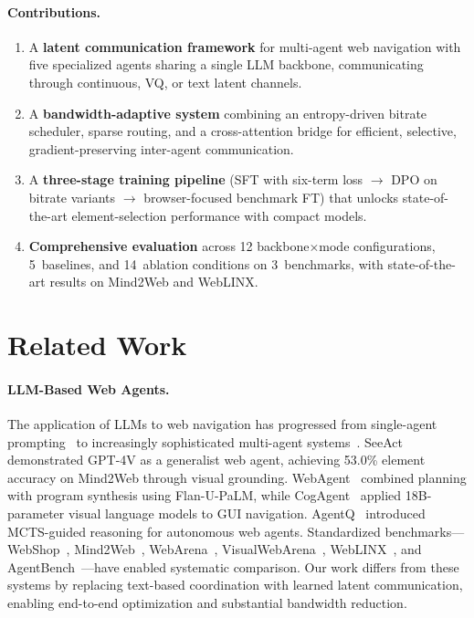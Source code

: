 \documentclass{article}
\begin{document}
\paragraph{Contributions.}
\begin{enumerate}[leftmargin=*,itemsep=1pt,topsep=2pt]
\item A \textbf{latent communication framework} for multi-agent web navigation with five specialized agents sharing a single LLM backbone, communicating through continuous, VQ, or text latent channels.
\item A \textbf{bandwidth-adaptive system} combining an entropy-driven bitrate scheduler, sparse routing, and a cross-attention bridge for efficient, selective, gradient-preserving inter-agent communication.
\item A \textbf{three-stage training pipeline} (SFT with six-term loss $\to$ DPO on bitrate variants $\to$ browser-focused benchmark FT) that unlocks state-of-the-art element-selection performance with compact models.
\item \textbf{Comprehensive evaluation} across 12 backbone$\times$mode configurations, 5~baselines, and 14~ablation conditions on 3~benchmarks, with state-of-the-art results on Mind2Web and WebLINX.
\end{enumerate}

\section{Related Work}
\label{sec:related}

\paragraph{LLM-Based Web Agents.}
The application of LLMs to web navigation has progressed from single-agent prompting~\cite{yao2023react,wang2023plan} to increasingly sophisticated multi-agent systems~\cite{wu2023autogen,hong2023metagpt}.
SeeAct~\cite{zheng2024seeact} demonstrated GPT-4V as a generalist web agent, achieving 53.0\% element accuracy on Mind2Web through visual grounding.
WebAgent~\cite{gur2024webagent} combined planning with program synthesis using Flan-U-PaLM, while CogAgent~\cite{hong2024cogagent} applied 18B-parameter visual language models to GUI navigation.
AgentQ~\cite{putta2024agentq} introduced MCTS-guided reasoning for autonomous web agents.
Standardized benchmarks---WebShop~\cite{yao2022webshop}, Mind2Web~\cite{deng2024mind2web}, WebArena~\cite{zhou2024webarena}, VisualWebArena~\cite{koh2024visualwebarena}, WebLINX~\cite{lu2024weblinx}, and AgentBench~\cite{liu2023agentbench}---have enabled systematic comparison.
Our work differs from these systems by replacing text-based coordination with learned latent communication, enabling end-to-end optimization and substantial bandwidth reduction.
\end{document}
